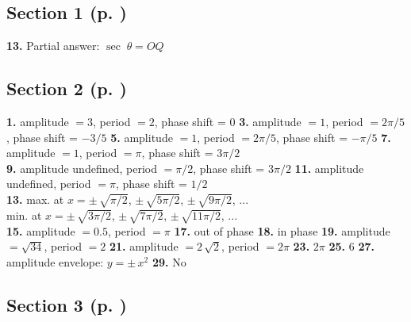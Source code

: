 \begin{multicols}{2}
\subsection*{Section 1 (p. \pageref{sec5dot1})}
\textbf{13.} Partial answer: $\sec\;\theta = OQ$
\subsection*{Section 2 (p. \pageref{sec5dot2})}
\textbf{1.} amplitude $= 3$, period $= 2$, phase shift = $0$ \quad
\textbf{3.} amplitude $= 1$, period $= 2\pi/5$, phase shift = $-3/5$ \quad
\textbf{5.} amplitude $= 1$, period $= 2\pi/5$, phase shift = $-\pi/5$ \quad
\textbf{7.} amplitude $= 1$, period $= \pi$, phase shift = $3\pi/2$\\
\textbf{9.} amplitude undefined, period $= \pi/2$, phase shift = $3\pi/2$ \quad
\textbf{11.} amplitude undefined, period $= \pi$, phase shift = $1/2$\\
\textbf{13.} max. at $x=\pm\,\sqrt{\pi/2}$, $\pm\,\sqrt{5\pi/2}$, $\pm\,\sqrt{9\pi/2}$, $...$\\
min. at $x=\pm\,\sqrt{3\pi/2}$, $\pm\,\sqrt{7\pi/2}$, $\pm\,\sqrt{11\pi/2}$, $...$\\
\textbf{15.} amplitude $= 0.5$, period $= \pi$ \quad \textbf{17.} out of phase \quad
\textbf{18.} in phase \quad \textbf{19.} amplitude $= \sqrt{34}$, period $= 2$ \quad
\textbf{21.} amplitude $= 2\,\sqrt{2}$, period $= 2\pi$ \quad
\textbf{23.} $2\pi$ \quad \textbf{25.} $6$ \quad \textbf{27.} amplitude envelope: $y=\pm\,x^2$ \quad
\textbf{29.} No

\end{multicols}


\subsection*{Section 3 (p. \pageref{sec5dot1})}

